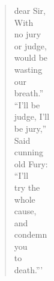 \documentclass[12pt]{book}
\begin{document}
\begin{verse}
\hspace{2.5cm}                   dear Sir,\\
\hspace{2.8cm}                         With\\
\hspace{2.5cm}                     no jury\\
\hspace{2.2cm}                  or judge,\\
\hspace{1.9cm}                would be\\
\hspace{1.6cm}              wasting\\
\hspace{1.3cm}             our\\
\hspace{1.6cm}              breath.''\\
\hspace{1.9cm}               ``I'll be\\
\hspace{2.2cm}                 judge, I'll\\
\hspace{2.5cm}                   be jury,''\\
\hspace{2.8cm}                    Said\\
\hspace{3.1cm}                     cunning\\
\hspace{2.8cm}                      old Fury:\\
\hspace{2.5cm}                     ``I'll\\
\hspace{2.5cm}                      try the\\
\hspace{2.8cm}                         whole\\
\hspace{3.1cm}                          cause,\\
\hspace{3.4cm}                             and\\
\hspace{2.8cm}                        condemn\\
\hspace{2.6cm}                       you\\
\hspace{2.3cm}                      to\\
\hspace{2.5cm}                       death.'''
\end{verse}
\end{document}
